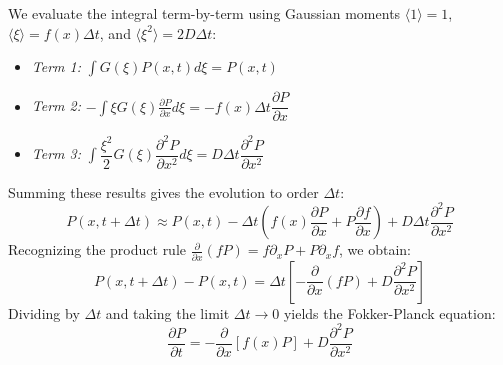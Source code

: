 \documentclass[12pt]{article}
\begin{document}
\begin{singlespace}
We evaluate the integral term-by-term using Gaussian moments $\langle 1 \rangle = 1$, $\langle \xi \rangle = f(x)\Delta t$, and $\langle \xi^2 \rangle = 2D\Delta t$:
\begin{itemize}
    \item \textit{Term 1:} $\int G(\xi) P(x,t) d\xi = P(x,t)$
    \item \textit{Term 2:} $-\int \xi G(\xi) \frac{\partial P}{\partial x} d\xi = -f(x)\Delta t \dfrac{\partial P}{\partial x}$
    \item \textit{Term 3:} $\int \dfrac{\xi^2}{2} G(\xi) \dfrac{\partial^2 P}{\partial x^2} d\xi = D\Delta t \dfrac{\partial^2 P}{\partial x^2}$
\end{itemize}
Summing these results gives the evolution to order $\Delta t$:
\begin{equation}
P(x, t+\Delta t) \approx P(x, t) - \Delta t \left( f(x) \frac{\partial P}{\partial x} + P \frac{\partial f}{\partial x} \right) + D\Delta t \frac{\partial^2 P}{\partial x^2}
\end{equation}
Recognizing the product rule $\frac{\partial}{\partial x}(fP) = f \partial_x P + P \partial_x f$, we obtain:
\begin{equation}
P(x, t+\Delta t) - P(x, t) = \Delta t \left[ -\frac{\partial}{\partial x} (f P) + D \frac{\partial^2 P}{\partial x^2} \right]
\end{equation}
Dividing by $\Delta t$ and taking the limit $\Delta t \to 0$ yields the Fokker-Planck equation:
\begin{equation}
\frac{\partial P}{\partial t} = -\frac{\partial}{\partial x} [f(x)P] + D \frac{\partial^2 P}{\partial x^2}
\end{equation}

\end{singlespace}
\end{document}
